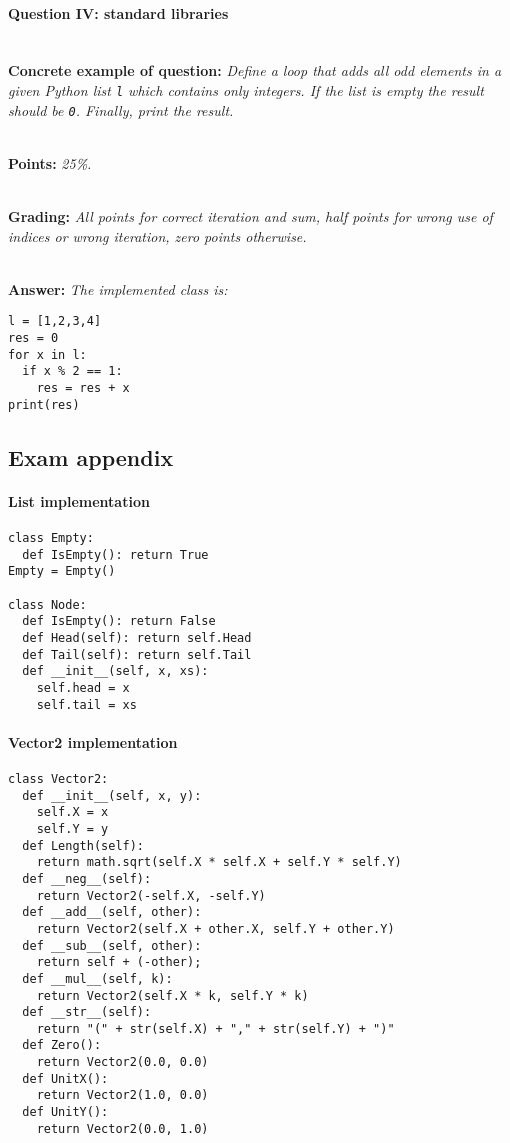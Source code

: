 \paragraph{Question IV: standard libraries} \ \\

\textbf{Concrete example of question:} \textit{Define a loop that adds all odd elements in a given Python list \texttt{l} which contains only integers. If the list is empty the result should be \texttt{0}. Finally, print the result.}

\ \\ 

\textbf{Points:} \textit{25\%.}

\ \\ 

\textbf{Grading:} \textit{All points for correct iteration and sum, half points for wrong use of indices or wrong iteration, zero points otherwise.}

\ \\ 

\textbf{Answer:} \textit{The implemented class is:}

\begin{lstlisting}
l = [1,2,3,4]
res = 0
for x in l:
  if x % 2 == 1:
    res = res + x
print(res)
\end{lstlisting}

\subsection{Exam appendix}

\paragraph{List implementation}
\begin{lstlisting}
class Empty:
  def IsEmpty(): return True
Empty = Empty()

class Node:
  def IsEmpty(): return False
  def Head(self): return self.Head
  def Tail(self): return self.Tail
  def __init__(self, x, xs):
    self.head = x
    self.tail = xs
\end{lstlisting}

\paragraph{Vector2 implementation}
\begin{lstlisting}
class Vector2:
  def __init__(self, x, y):
    self.X = x
    self.Y = y
  def Length(self):
    return math.sqrt(self.X * self.X + self.Y * self.Y)
  def __neg__(self):
    return Vector2(-self.X, -self.Y)
  def __add__(self, other):
    return Vector2(self.X + other.X, self.Y + other.Y)
  def __sub__(self, other):
    return self + (-other);
  def __mul__(self, k):
    return Vector2(self.X * k, self.Y * k)
  def __str__(self):
    return "(" + str(self.X) + "," + str(self.Y) + ")"
  def Zero(): 
    return Vector2(0.0, 0.0)
  def UnitX(): 
    return Vector2(1.0, 0.0)
  def UnitY(): 
    return Vector2(0.0, 1.0)
\end{lstlisting}

